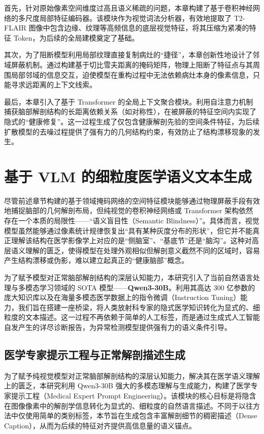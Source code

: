 \documentclass[Win]{xjtuBSThesis}  %
\begin{document}
首先，针对原始像素空间维度过高且语义稀疏的问题，本章构建了基于卷积神经网络的多尺度局部特征编码器。该模块作为视觉词法分析器，有效地提取了 T2-FLAIR 图像中包含边缘、纹理等高频信息的底层视觉特征，将其压缩为紧凑的特征 Token，为后续的全局建模奠定了基础。

其次，为了阻断模型利用局部纹理直接复制病灶的“捷径”，本章创新性地设计了邻域屏蔽机制。通过构建基于切比雪夫距离的掩码矩阵，物理上阻断了特征点与其周围局部邻域的信息交互，迫使模型在重构过程中无法依赖病灶本身的像素信息，只能寻求远距离的上下文线索。

最后，本章引入了基于 Transformer 的全局上下文聚合模块。利用自注意力机制捕获脑部解剖结构的长距离依赖关系（如对称性），在被屏蔽的特征空间内实现了隐式的“健康修复”。这一过程生成了仅包含健康解剖先验的空间条件特征，为后续扩散模型的去噪过程提供了强有力的几何结构约束，有效防止了结构漂移现象的发生。
\section{基于 VLM 的细粒度医学语义文本生成}

尽管前述章节构建的基于领域掩码网络的空间特征模块能够通过物理屏蔽手段有效地捕捉脑部的几何解剖布局，但纯视觉的卷积神经网络或 Transformer 架构依然存在一个本质的局限性——“语义盲目性（Semantic Blindness）”。具体而言，视觉模型虽然能够通过像素统计规律恢复出“具有某种灰度分布的形状”，但它并不能真正理解该结构在医学影像学上对应的是“侧脑室”、“基底节”还是“脑沟”。这种对高层语义理解的匮乏，使得模型在处理外观相似但解剖意义截然不同的区域时，容易产生结构漂移或伪影，难以建立起真正的“健康脑部”概念。

为了赋予模型对正常脑部解剖结构的深层认知能力，本研究引入了当前自然语言处理与多模态学习领域的 SOTA 模型——\textbf{Qwen3-30B}。利用其高达 300 亿参数的庞大知识库以及在海量多模态医学数据上的指令微调（Instruction Tuning）能力，我们旨在搭建一座桥梁，将人类放射科专家的隐式医学知识转化为显式的、细粒度的文本描述。这一过程不再依赖于简单的人工标签，而是通过生成式人工智能自发产生的详尽诊断报告，为异常检测模型提供强有力的语义条件引导。

\subsection{医学专家提示工程与正常解剖描述生成}
\label{subsec:prompt_engineering}

为了赋予纯视觉模型对正常脑部解剖结构的深层认知能力，解决其在医学语义理解上的匮乏，本研究利用 Qwen3-30B 强大的多模态理解与生成能力，构建了医学专家提示工程（Medical Expert Prompt Engineering）。该模块的核心目标是将隐含在图像像素中的解剖学信息转化为显式的、细粒度的自然语言描述。不同于以往方法中仅使用简单的类别标签，本节旨在生成包含丰富解剖细节的稠密描述（Dense Caption），从而为后续的特征对齐提供高信息量的语义锚点。
\end{document}

